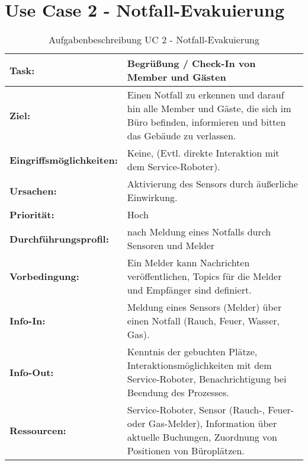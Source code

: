 \section*{Use Case 2 - Notfall-Evakuierung}
\begin{table}[hbt!]
    \begin{center}
        \begin{tabular}{| p{3cm} | p{12.75cm} | }
            \hline
                \textbf{Task:} & \textbf{Begrüßung / Check-In von Member und Gästen} \\
            \hline
                \textbf{Ziel:} & Einen Notfall zu erkennen und darauf hin alle Member und Gäste, die sich im Büro befinden, informieren und bitten das Gebäude zu verlassen. \\
            \hline
                \textbf{Eingriffsmöglichkeiten:} & Keine, (Evtl. direkte Interaktion mit dem Service-Roboter). \\
            \hline
                \textbf{Ursachen:} & Aktivierung des Sensors durch äußerliche Einwirkung. \\
            \hline
                \textbf{Priorität:} & Hoch \\
            \hline
                \textbf{Durchführungsprofil:} & nach Meldung eines Notfalls durch Sensoren und Melder \\ 
            \hline
                \textbf{Vorbedingung:} & Ein Melder kann Nachrichten veröffentlichen, Topics für die Melder und Empfänger sind definiert. \\
            \hline 
                \textbf{Info-In:} & Meldung eines Sensors (Melder) über einen Notfall (Rauch, Feuer, Wasser, Gas). \\
            \hline
                \textbf{Info-Out:} & Kenntnis der gebuchten Plätze, Interaktionsmöglichkeiten mit dem Service-Roboter, Benachrichtigung bei Beendung des Prozesses. \\
            \hline
                \textbf{Ressourcen:} & Service-Roboter, Sensor (Rauch-, Feuer- oder Gas-Melder), Information über aktuelle Buchungen, Zuordnung von Positionen von Büroplätzen. \\
            \hline
        \end{tabular}
    \end{center}
    \caption{Aufgabenbeschreibung UC 2 - Notfall-Evakuierung}
    \label{tab:evacuation}
\end{table}

	
